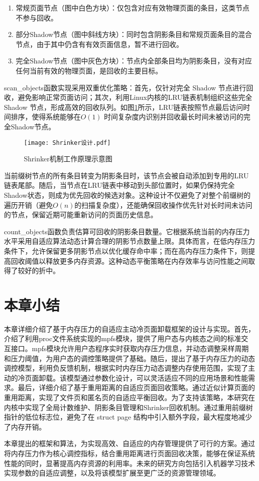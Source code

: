 \begin{enumerate}
  \item 常规页面节点（图中白色方块）：仅包含对应有效物理页面的条目，这类节点不参与回收。
  \item 部分Shadow节点（图中斜线方块）：同时包含阴影条目和常规页面条目的混合节点，由于其中仍含有有效页面信息，暂不进行回收。
  \item 完全Shadow节点（图中灰色方块）：节点内全部条目均为阴影条目，没有对应任何当前有效的物理页面，是回收的主要目标。
\end{enumerate}
scan\_objects函数实现采用双重优化策略：首先，仅针对完全 Shadow 节点进行回收，避免影响正常页面访问；其次，利用Linux内核的LRU链表机制组织这些完全 Shadow 节点，形成高效的回收队列。如图\ref{fig:shrink}所示，LRU链表按照节点最后访问时间排序，使得系统能够在\( O(1) \) 时间复杂度内识别并回收最长时间未被访问的完全Shadow节点。
\begin{figure}[htbp]
  \centering
  \texttt{[image: Shrinker设计.pdf]}
  \caption{Shrinker机制工作原理示意图}
  \label{fig:shrink}
\end{figure}
当前缀树节点的所有条目转变为阴影条目时，该节点会被自动添加到专用的LRU链表尾部。随后，当节点在LRU链表中移动到头部位置时，如果仍保持完全Shadow状态，则成为优先回收的候选对象。这种设计不仅避免了对整个前缀树的遍历开销（避免\(O(n)\)的扫描复杂度），还能确保回收操作优先针对长时间未访问的节点，保留近期可能重新访问的页面历史信息。

count\_objects函数负责估算可回收的阴影条目数量。它根据系统当前的内存压力水平采用自适应算法动态计算合理的阴影节点数量上限。具体而言，在低内存压力条件下，允许保留更多阴影节点以优化缓存命中率；而在高内存压力条件下，则提高回收阈值以释放更多内存资源。这种动态平衡策略在内存效率与访问性能之间取得了较好的折中。

\section{本章小结}
\label{sec:本章小结}

本章详细介绍了基于内存压力的自适应主动冷页面卸载框架的设计与实现。首先，介绍了利用proc文件系统实现的mpfs模块，提供了用户态与内核态之间的标准交互接口。mpfs模块允许用户态程序实时获取内存压力信息，并动态调整采样周期和压力阈值，为用户态的调控策略提供了基础。随后，提出了基于内存压力的动态调控模型，利用负反馈机制，根据实时内存压力动态调整内存使用范围，实现了主动的冷页面卸载。该模型通过参数化设计，可以灵活适应不同的应用场景和性能需求。最后，详细介绍了基于重用距离的自适应页面回收策略。通过近似计算页面的重用距离，实现了文件页和匿名页的自适应平衡回收。为了支持该策略，本研究在内核中实现了全局计数维护、阴影条目管理和Shrinker回收机制。通过重用前缀树指针的低位标志位，避免了在 struct page 结构中引入额外字段，最大程度地减少了内存开销。

本章提出的框架和算法，为实现高效、自适应的内存管理提供了可行的方案。通过将内存压力作为核心调控指标，结合重用距离进行页面回收决策，能够在保证系统性能的同时，显著提高内存资源的利用率。未来的研究方向包括引入机器学习技术实现参数的自适应调整，以及将该模型扩展至更广泛的资源管理领域。
